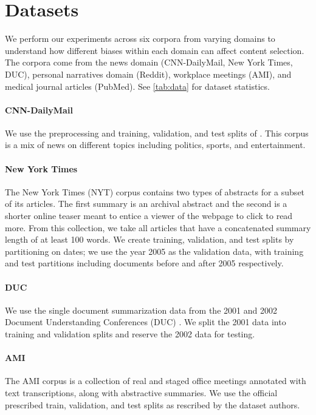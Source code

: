 

\section{Datasets}
\label{sec:datasets}

We perform our experiments across six corpora from varying domains to 
understand how different biases within each domain can affect content 
selection. The corpora come from the news domain
(CNN-DailyMail, New York Times, DUC), personal narratives domain (Reddit),
workplace meetings (AMI), and medical journal articles (PubMed). See 
\autoref{tab:data} for dataset statistics.


\paragraph{CNN-DailyMail} We use the preprocessing and training, validation, 
and test splits
of \citet{see2017pointer}.
This corpus is a mix of news on different topics including politics,
sports, and entertainment.

\paragraph{New York Times}The New York Times (NYT) corpus \citep{sandhaus2008new} contains
 two types of abstracts for a subset of its articles. The first summary is
an archival abstract and the 
second is a shorter online teaser meant to entice a viewer of the webpage to
click to read more. From this collection, we take all articles that have 
a concatenated summary length of at least 100 words.
We create training, validation, and test splits by partitioning on dates;
we use the year 2005 as the validation data, with training and test partitions
including documents before and after 2005 respectively.

\paragraph{DUC} We use the single document summarization data from the 2001
and 2002
Document Understanding Conferences (DUC) \citep{over2002introduction}. We split the 2001 data into training
and validation splits and reserve the 2002 data for testing.



\paragraph{AMI} The AMI corpus \citep{carletta2005ami} 
is a collection of real and staged office meetings
annotated with text transcriptions, along with abstractive
summaries. We use the official prescribed train, validation, and test
splits as rescribed by the dataset authors.

